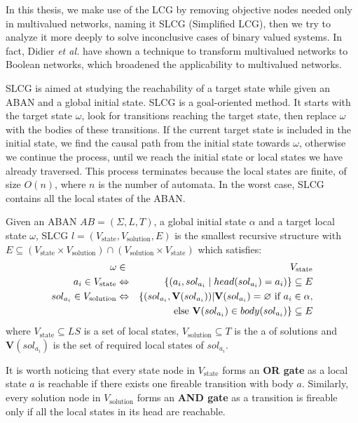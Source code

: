 In this thesis, we make use of the LCG by removing objective nodes needed only in multivalued networks, naming it SLCG (Simplified LCG), then we try to analyze it more deeply to solve inconclusive cases of binary valued systems.
In fact, Didier \textit{et al.} \cite{didier2011mapping} have shown a technique to transform multivalued networks to Boolean networks, which broadened the applicability to multivalued networks.

SLCG is aimed at studying the reachability of a target state while given an ABAN and a global initial state.
SLCG is a goal-oriented method.
It starts with the target state $\omega$, look for transitions reaching the target state, then replace $\omega$ with the bodies of these transitions.
If the current target state is included in the initial state, we find the causal path from the initial state towards $\omega$, otherwise we continue the process, until we reach the initial state or local states we have already traversed.
This process terminates because the local states are finite, of size $O(n)$, where $n$ is the number of automata.
In the worst case, SLCG contains all the local states of the ABAN.

\begin{definition}\label{defSLCG}
Given an ABAN $AB = (\Sigma,L,T)$, a global initial state $\alpha$ and a target local state $\omega$, SLCG $l= (V_{\mathrm{state}},V_{\mathrm{solution}},E)$ is the smallest recursive structure with $E \subseteq (V_{\mathrm{state}}\times V_{\mathrm{solution}})\cap (V_{\mathrm{solution}}\times V_{\mathrm{state}})$ which satisfies:
\begin{eqnarray*}
    \omega&\in& V_{\mathrm{state}} \\
    a_i\in V_{\mathrm{state}} &\Leftrightarrow& \{ (a_i, sol_{a_i}\mid head(sol_{a_i})=a_i)\}\subseteq E \\
    sol_{a_i}\in V_{\mathrm{solution}}&\Leftrightarrow& \{ (sol_{a_i},\mathbf{V}(sol_{a_i}))| \mathbf{V}(sol_{a_i})=\varnothing \text{ \rm if } a_i\in \alpha,\\
    &&\text{ \rm else }\mathbf{V}(sol_{a_i})\in body(sol_{a_i}) \}\subseteq E
\end{eqnarray*}
where $V_{\mathrm{state}}\subseteq LS$ is a set of local states, $V_{\mathrm{solution}}\subseteq T$ is the a of solutions and $\mathbf{V}(sol_{a_i})$ is the set of required local states of $sol_{a_i}$.
\end{definition}

It is worth noticing that every state node in $V_{\mathrm{state}}$ forms an \textbf{OR gate} as a local state $a$ is reachable if there exists one fireable transition with body $a$.
Similarly, every solution node in $V_{\mathrm{solution}}$ forms an \textbf{AND gate} as a transition is fireable only if all the local states in its head are reachable.

